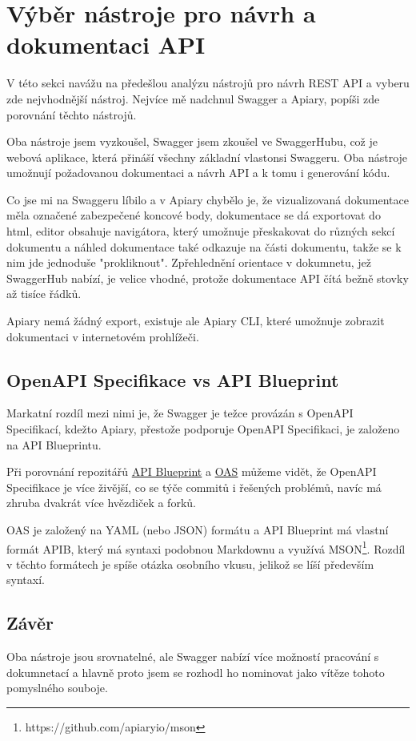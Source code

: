 \documentclass[thesis=B,czech]{FITthesis}[2012/06/26]
\begin{document}
    \section{Výběr nástroje pro návrh a dokumentaci API}
        V této sekci navážu na předešlou analýzu nástrojů pro návrh REST API a vyberu zde nejvhodnější nástroj. Nejvíce mě nadchnul Swagger a Apiary, popíši zde porovnání těchto nástrojů.
        

        Oba nástroje jsem vyzkoušel, Swagger jsem zkoušel ve SwaggerHubu, což je webová aplikace, která přináší všechny základní vlastonsi Swaggeru. Oba nástroje umožnují požadovanou dokumentaci a návrh API a k tomu i generování kódu.
        
        Co jse mi na Swaggeru líbilo a v Apiary chybělo je, že vizualizovaná dokumentace měla označené zabezpečené koncové body, dokumentace se dá exportovat do html, editor obsahuje navigátora, který umožnuje přeskakovat do různých sekcí dokumentu a náhled dokumentace také odkazuje na části dokumentu, takže se k nim jde jednoduše "prokliknout". Zpřehlednění orientace v dokumnetu, jež SwaggerHub nabízí, je velice vhodné, protože dokumentace API čítá bežně stovky až tisíce řádků.
        
        Apiary nemá žádný export, existuje ale Apiary CLI, které umožnuje zobrazit dokumentaci v internetovém prohlížeči.
                
        \subsection{OpenAPI Specifikace vs API Blueprint}
            Markatní rozdíl mezi nimi je, že Swagger je težce provázán s OpenAPI Specifikací, kdežto Apiary, přestože podporuje OpenAPI Specifikaci, je založeno na API Blueprintu.

            Při porovnání repozitářů \href{https://github.com/apiaryio/api-blueprint/graphs/contributors}{API Blueprint} a \href{https://github.com/OAI/OpenAPI-Specification/graphs/contributors}{OAS} můžeme vidět, že OpenAPI Specifikace je více živější, co se týče commitů i řešených problémů, navíc má zhruba dvakrát více hvězdiček a forků.
            
            OAS je založený na YAML (nebo JSON) formátu a API Blueprint má vlastní formát APIB, který má syntaxi podobnou Markdownu a využívá MSON\footnote{https://github.com/apiaryio/mson}. Rozdíl v těchto formátech je spíše otázka osobního vkusu, jelikož se líší především syntaxí.
        \subsection{Závěr}
            Oba nástroje jsou srovnatelné, ale Swagger nabízí více možností pracování s dokumnetací a hlavně proto jsem se rozhodl ho nominovat jako vítěze tohoto pomyslného souboje.
\end{document}
